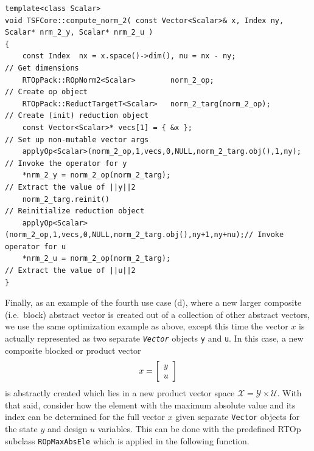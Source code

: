 {\scriptsize\begin{verbatim}
template<class Scalar>
void TSFCore::compute_norm_2( const Vector<Scalar>& x, Index ny, Scalar* nrm_2_y, Scalar* nrm_2_u )
{
    const Index  nx = x.space()->dim(), nu = nx - ny;                   // Get dimensions
    RTOpPack::ROpNorm2<Scalar>        norm_2_op;                        // Create op object
    RTOpPack::ReductTargetT<Scalar>   norm_2_targ(norm_2_op);           // Create (init) reduction object
    const Vector<Scalar>* vecs[1] = { &x };                             // Set up non-mutable vector args
    applyOp<Scalar>(norm_2_op,1,vecs,0,NULL,norm_2_targ.obj(),1,ny);    // Invoke the operator for y
    *nrm_2_y = norm_2_op(norm_2_targ);                                  // Extract the value of ||y||2
    norm_2_targ.reinit()                                                // Reinitialize reduction object
    applyOp<Scalar>(norm_2_op,1,vecs,0,NULL,norm_2_targ.obj(),ny+1,ny+nu);// Invoke operator for u
    *nrm_2_u = norm_2_op(norm_2_targ);                                  // Extract the value of ||u||2
}
\end{verbatim}}

\noindent Finally, as an example of the fourth use case (d), where a new larger
composite (i.e.~block) abstract vector is created out of a collection
of other abstract vectors, we use the same optimization example as
above, except this time the vector $x$ is actually represented as two
separate \texttt{\textit{Vector}} objects \texttt{y} and \texttt{u}.
In this case, a new composite blocked or product vector
%
\[
x = {\bmat{c} y \\ u \emat}
\]
%
is abstractly created which lies in a new product vector space
$\mathcal{X} = \mathcal{Y} \times \mathcal{U}$.  With that said,
consider how the element with the maximum absolute value and its index
can be determined for the full vector $x$ given separate
\texttt{Vector} objects for the state $y$ and design $u$ variables.
This can be done with the predefined RTOp subclass
\texttt{ROpMax\-AbsEle} which is applied in the following
function.

